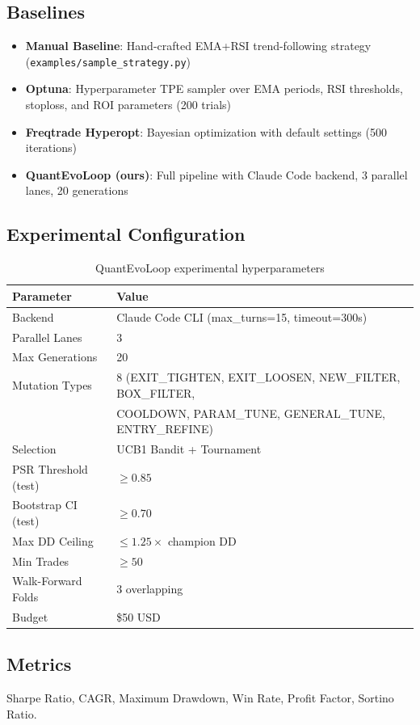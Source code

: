 \documentclass[11pt,a4paper]{article}
\begin{document}
\subsection{Baselines}
\begin{itemize}
  \item \textbf{Manual Baseline}: Hand-crafted EMA+RSI trend-following strategy
        (\texttt{examples/sample\_strategy.py})
  \item \textbf{Optuna}: Hyperparameter TPE sampler over EMA periods, RSI thresholds,
        stoploss, and ROI parameters (200 trials)
  \item \textbf{Freqtrade Hyperopt}: Bayesian optimization with default settings (500 iterations)
  \item \textbf{QuantEvoLoop (ours)}: Full pipeline with Claude Code backend,
        3 parallel lanes, 20 generations
\end{itemize}

\subsection{Experimental Configuration}
\begin{table}[h]
\centering
\caption{QuantEvoLoop experimental hyperparameters}
\label{tab:config}
\begin{tabular}{ll}
\toprule
Parameter & Value \\
\midrule
Backend & Claude Code CLI (max\_turns=15, timeout=300s) \\
Parallel Lanes & 3 \\
Max Generations & 20 \\
Mutation Types & 8 (EXIT\_TIGHTEN, EXIT\_LOOSEN, NEW\_FILTER, BOX\_FILTER, \\
               & COOLDOWN, PARAM\_TUNE, GENERAL\_TUNE, ENTRY\_REFINE) \\
Selection & UCB1 Bandit + Tournament \\
PSR Threshold (test) & $\geq 0.85$ \\
Bootstrap CI (test) & $\geq 0.70$ \\
Max DD Ceiling & $\leq 1.25\times$ champion DD \\
Min Trades & $\geq 50$ \\
Walk-Forward Folds & 3 overlapping \\
Budget & \$50 USD \\
\bottomrule
\end{tabular}
\end{table}

\subsection{Metrics}
Sharpe Ratio, CAGR, Maximum Drawdown, Win Rate, Profit Factor, Sortino Ratio.
\end{document}
